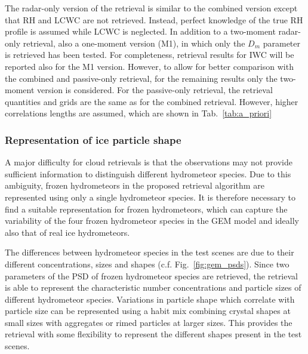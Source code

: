 \documentclass[journal abbreviation, manuscript]{copernicus}
\begin{document}
The radar-only version of the retrieval is similar to the combined version
except that RH and LCWC are not retrieved. Instead, perfect knowledge of the
true RH profile is assumed while LCWC is neglected. In addition to a two-moment
radar-only retrieval, also a one-moment version (M1), in which only the $D_m$
parameter is retrieved has been tested. For completeness, retrieval results for
IWC will be reported also for the M1 version. However, to allow for better
comparison with the combined and passive-only retrieval, for the remaining
results only the two-moment version is considered. For the passive-only
retrieval, the retrieval quantities and grids are the same as for the combined
retrieval. However, higher correlations lengths are assumed, which are shown in
Tab.~\ref{tab:a_priori}

\subsubsection{Representation of ice particle shape}
\label{sec:method:partilce_models}

A major difficulty for cloud retrievals is that the observations may not provide
sufficient information to distinguish different hydrometeor species. Due to this
ambiguity, frozen hydrometeors in the proposed retrieval algorithm are
represented using only a single hydrometeor species. It is therefore necessary
to find a suitable representation for frozen hydrometeors, which can capture the
variability of the four frozen hydrometeor species in the GEM model and ideally also
that of real ice hydrometeors.

The differences between hydrometeor species in the test scenes are due to their
different concentrations, sizes and shapes (c.f. Fig.~\ref{fig:gem_psds}). Since
two parameters of the PSD of frozen hydrometeor species are retrieved, the
retrieval is able to represent the characteristic number concentrations and
particle sizes of different hydrometeor species. Variations in particle shape
which correlate with particle size can be represented using a habit mix
combining crystal shapes at small sizes with aggregates or rimed particles at
larger sizes. This provides the retrieval with some flexibility to represent the
different shapes present in the test scenes.
\end{document}

